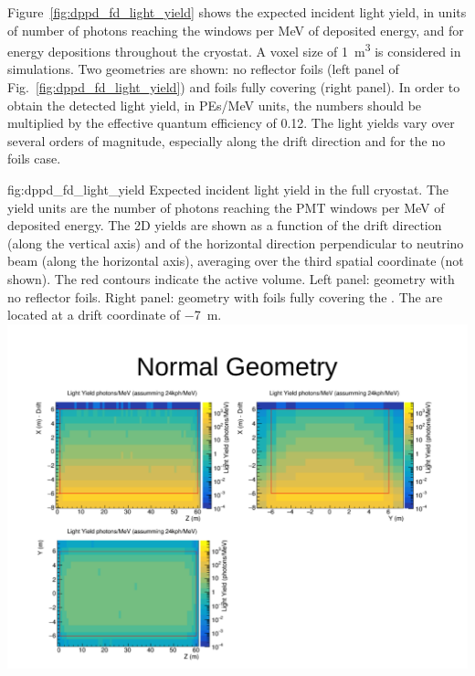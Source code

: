 Figure~\ref{fig:dppd_fd_light_yield} shows the expected incident light yield, in units of number of photons reaching the  windows per MeV of deposited energy, and for energy depositions throughout the   cryostat. A voxel size of \SI{1}{\m^3} is considered in    simulations. Two geometries are shown: no  reflector foils (left panel of Fig.~\ref{fig:dppd_fd_light_yield}) and foils fully covering  (right panel). In order to obtain the detected light yield, in PEs/\si{MeV} units, the numbers should be multiplied by the effective quantum efficiency of 0.12. The light yields vary over several orders of magnitude, especially along the drift direction and for the no foils case.

\begin{dunefigure}{fig:dppd_fd_light_yield}
{Expected incident light yield in the full   cryostat. The yield units are the number of photons reaching the PMT windows per \si{\MeV} of deposited energy. The 2D yields are shown as a function of the drift direction (along the vertical axis) and of the horizontal direction perpendicular to neutrino beam (along the horizontal axis), averaging over the third spatial coordinate (not shown). The red contours indicate the  active volume. Left panel: geometry with no  reflector foils. Right panel: geometry with foils fully covering the . The  are located at a drift coordinate of \SI{-7}{\m}.}
\includegraphics[trim={14cm 9cm 2cm 4.5cm}, clip, height=0.22\textheight]{graphics/dppd_fd_light_yield_nofoil.pdf} \hfill

\end{dunefigure}
